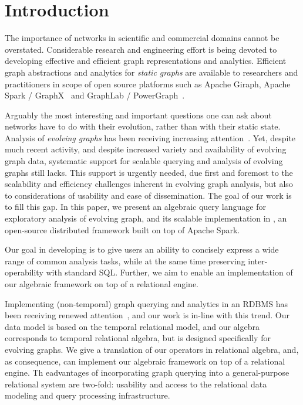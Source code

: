 \section{Introduction}
\label{sec:intro}

The importance of networks in scientific and commercial domains cannot
be overstated.  Considerable research and engineering effort is being
devoted to developing effective and efficient graph representations
and analytics.  Efficient graph abstractions and analytics for {\em
  static graphs} are available to researchers and practitioners in
scope of open source platforms such as Apache Giraph, Apache Spark /
GraphX~\cite{DBLP:conf/osdi/GonzalezXDCFS14} and GraphLab /
PowerGraph~\cite{DBLP:conf/osdi/GonzalezLGBG12}.

Arguably the most interesting and important questions one can ask
about networks have to do with their evolution, rather than with their
static state.  Analysis of {\em evolving graphs} has been receiving
increasing
attention~\cite{DBLP:journals/csur/AggarwalS14,Chan2008,Kan2009,Miao2015,Ren2011,Semertzidis2015}.
Yet, despite much recent activity, and despite increased variety and
availability of evolving graph data, systematic support for scalable
querying and analysis of evolving graphs still lacks.  This support is
urgently needed, due first and foremost to the scalability and
efficiency challenges inherent in evolving graph analysis, but also to
considerations of usability and ease of dissemination.  The goal of
our work is to fill this gap.  In this paper, we present an algebraic
query language for exploratory analysis of evolving graph, and its
scalable implementation in \ql, an open-source distributed framework
built on top of Apache Spark.

Our goal in developing \tga is to give users an ability to concisely
express a wide range of common analysis tasks, while at the same time
preserving inter-operability with standard SQL.  Further, we aim to
enable an implementation of our algebraic framework on top of a
relational engine. 

Implementing (non-temporal) graph querying and analytics in an RDBMS
has been receiving renewed
attention~\cite{DBLP:conf/sigmod/AbergerTOR16,DBLP:conf/sigmod/SunFSKHX15,DBLP:journals/pvldb/Xirogiannopoulos15},
and our work is in-line with this trend. Our data model is based on
the temporal relational model, and our algebra corresponds to temporal
relational algebra, but is designed specifically for evolving graphs.
We give a translation of our operators in relational algebra, and, as
consequence, can implement our algebraic framework on top of a
relational engine.  Th eadvantages of incorporating graph querying
into a general-purpose relational system are two-fold: usability and
access to the relational data modeling and query processing
infrastructure. 

